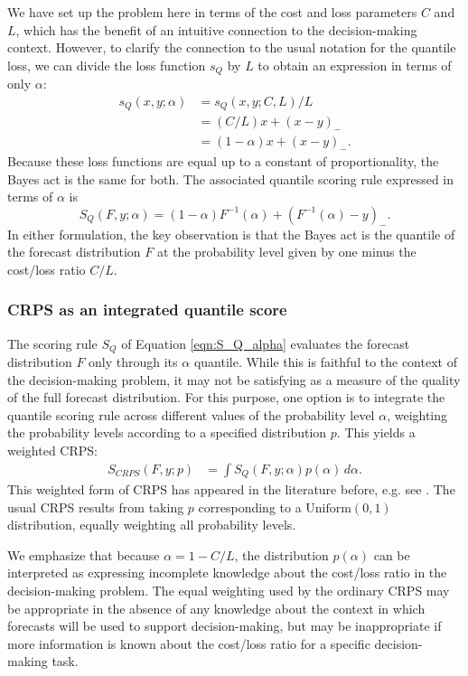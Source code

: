 \documentclass{article}
\begin{document}
We have set up the problem here in terms of the cost and loss parameters $C$ and $L$, which has the benefit of an intuitive connection to the decision-making context. However, to clarify the connection to the usual notation for the quantile loss, we can divide the loss function $s_Q$ by $L$ to obtain an expression in terms of only $\alpha$:
\begin{align*}
s_Q(x,y; \alpha) &= s_Q(x,y; C, L)/L \\
&= (C/L)x + (x-y)_- \\
&= (1 - \alpha)x + (x-y)_-.
\end{align*}
Because these loss functions are equal up to a constant of proportionality, the Bayes act is the same for both. The associated quantile scoring rule expressed in terms of $\alpha$ is
\begin{equation}
S_Q(F, y; \alpha) = (1 - \alpha)F^{-1}(\alpha) + \left(F^{-1}(\alpha) - y\right)_-. \label{eqn:S_Q_alpha}
\end{equation}
In either formulation, the key observation is that the Bayes act is the quantile of the forecast distribution $F$ at the probability level given by one minus the cost/loss ratio $C/L$.

\subsubsection{CRPS as an integrated quantile score}
\label{sec:methods.quantileloss.crps}

The scoring rule $S_Q$ of Equation \eqref{eqn:S_Q_alpha} evaluates the forecast distribution $F$ only through its $\alpha$ quantile. While this is faithful to the context of the decision-making problem, it may not be satisfying as a measure of the quality of the full forecast distribution. For this purpose, one option is to integrate the quantile scoring rule across different values of the probability level $\alpha$, weighting the probability levels according to a specified distribution $p$. This yields a weighted CRPS:
\begin{align*}
S_{CRPS}(F, y; p) &= \int S_Q(F, y; \alpha) p(\alpha) \, d\alpha.
\end{align*}
This weighted form of CRPS has appeared in the literature before, e.g. see \cite{gneiting2011weightedScoringRules}. The usual CRPS results from taking $p$ corresponding to a $\text{Uniform}(0,1)$ distribution, equally weighting all probability levels.

We emphasize that because $\alpha = 1 - C/L$, the distribution $p(\alpha)$ can be interpreted as expressing incomplete knowledge about the cost/loss ratio in the decision-making problem. The equal weighting used by the ordinary CRPS may be appropriate in the absence of any knowledge about the context in which forecasts will be used to support decision-making, but may be inappropriate if more information is known about the cost/loss ratio for a specific decision-making task.
\end{document}
